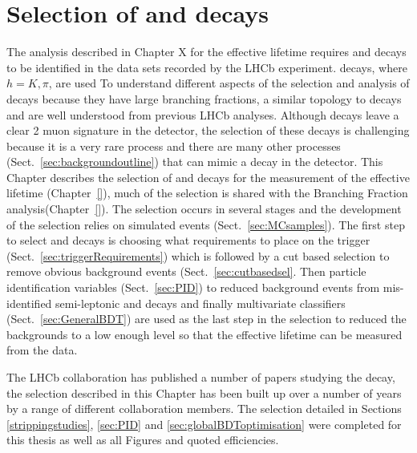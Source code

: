 

\chapter{Selection of \bsmumu and \bhh decays}
\label{selection_chapter}


The analysis described in Chapter X for the \bsmumu effective lifetime requires \bsmumu and \bhh decays to be identified in the data sets recorded by the LHCb experiment. \bhh decays, where $h = K, \pi$, are used To understand different aspects of the selection and analysis of \bsmumu decays because they have large branching fractions, a similar topology to \bsmumu decays and are well understood from previous LHCb analyses. Although \bsmumu decays leave a clear 2 muon signature in the detector, the selection of these decays is challenging because it is a very rare process and there are many other processes (Sect.~\ref{sec:backgroundoutline}) that can mimic a \bsmumu decay in the detector. This Chapter describes the selection of \bmumu and \bhh decays for the measurement of the \bsmumu effective lifetime (Chapter~\ref{}), much of the selection is shared with the \bmumu Branching Fraction analysis(Chapter~\ref{}). The selection occurs in several stages and the development of the selection relies on simulated events (Sect.~\ref{sec:MCsamples}). The first step to select \bsmumu and \bhh decays is choosing what requirements to place on the trigger (Sect.~\ref{sec:triggerRequirements}) which is followed by a cut based selection to remove obvious background events (Sect.~\ref{sec:cutbasedsel}. Then particle identification variables (Sect.~\ref{sec:PID}) to reduced background events from mis-identified semi-leptonic and \bhh decays and finally multivariate classifiers (Sect.~\ref{sec:GeneralBDT}) are used as the last step in the selection to reduced the backgrounds to a low enough level so that the \bsmumu effective lifetime can be measured from the data. 

The LHCb collaboration has published a number of papers studying the \bsmumu decay, the selection described in this Chapter has been built up over a number of years by a range of different collaboration members. The selection detailed in Sections \ref{strippingstudies}, \ref{sec:PID} and \ref{sec:globalBDToptimisation} were completed for this thesis as well as all Figures and quoted efficiencies.


